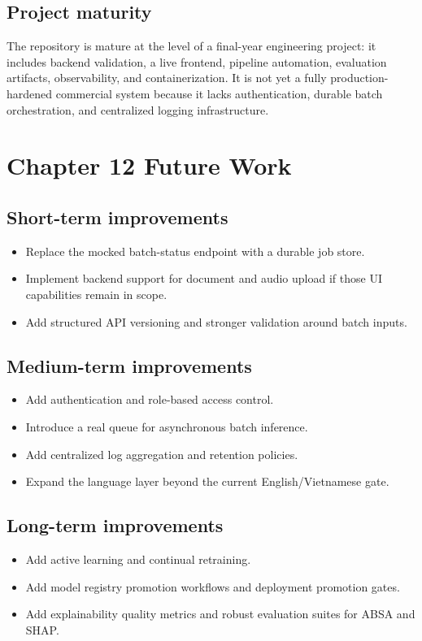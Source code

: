 \documentclass[12pt, a4paper]{article}
\begin{document}
\subsection{Project maturity}
The repository is mature at the level of a final-year engineering project: it includes backend validation, a live frontend, pipeline automation, evaluation artifacts, observability, and containerization. It is not yet a fully production-hardened commercial system because it lacks authentication, durable batch orchestration, and centralized logging infrastructure.

\section{Chapter 12 Future Work}

\subsection{Short-term improvements}
\begin{itemize}[noitemsep]
  \item Replace the mocked batch-status endpoint with a durable job store.
  \item Implement backend support for document and audio upload if those UI capabilities remain in scope.
  \item Add structured API versioning and stronger validation around batch inputs.
\end{itemize}

\subsection{Medium-term improvements}
\begin{itemize}[noitemsep]
  \item Add authentication and role-based access control.
  \item Introduce a real queue for asynchronous batch inference.
  \item Add centralized log aggregation and retention policies.
  \item Expand the language layer beyond the current English/Vietnamese gate.
\end{itemize}

\subsection{Long-term improvements}
\begin{itemize}[noitemsep]
  \item Add active learning and continual retraining.
  \item Add model registry promotion workflows and deployment promotion gates.
  \item Add explainability quality metrics and robust evaluation suites for ABSA and SHAP.
\end{itemize}
\end{document}
